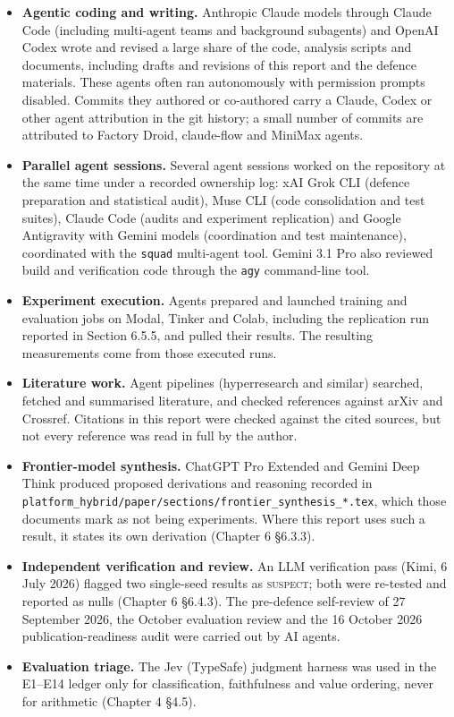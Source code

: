 \begin{itemize}
\item \textbf{Agentic coding and writing.} Anthropic Claude models through
Claude Code (including multi-agent teams and background subagents) and OpenAI
Codex wrote and revised a large share of the code, analysis scripts and documents,
including drafts and revisions of this report and the defence materials. These
agents often ran autonomously with permission prompts disabled. Commits they
authored or co-authored carry a Claude, Codex or other agent attribution in
the git history; a small number of commits are attributed to Factory Droid,
claude-flow and MiniMax agents.
\item \textbf{Parallel agent sessions.} Several agent sessions worked on the
repository at the same time under a recorded ownership log: xAI Grok CLI
(defence preparation and statistical audit), Muse CLI (code consolidation and
test suites), Claude Code (audits and experiment replication) and Google
Antigravity with Gemini models (coordination and test maintenance), coordinated
with the \texttt{squad} multi-agent tool. Gemini 3.1 Pro also reviewed build
and verification code through the \texttt{agy} command-line tool.
\item \textbf{Experiment execution.} Agents prepared and launched training and
evaluation jobs on Modal, Tinker and Colab, including the replication run
reported in Section 6.5.5, and pulled their results. The resulting
measurements come from those executed runs.
\item \textbf{Literature work.} Agent pipelines (hyperresearch and similar)
searched, fetched and summarised literature, and checked references against
arXiv and Crossref. Citations in this report were checked against the cited
sources, but not every reference was read in full by the author.
\item \textbf{Frontier-model synthesis.} ChatGPT Pro Extended and Gemini Deep
Think produced proposed derivations and reasoning recorded in
\texttt{platform\_hybrid/paper/sections/frontier\_synthesis\_*.tex}, which those
documents mark as not being experiments. Where this report uses such a result,
it states its own derivation (Chapter 6 \S6.3.3).
\item \textbf{Independent verification and review.} An LLM verification pass
(Kimi, 6 July 2026) flagged two single-seed results as \textsc{suspect}; both
were re-tested and reported as nulls (Chapter 6 \S6.4.3). The pre-defence
self-review of 27 September 2026, the October evaluation review and the
16 October 2026 publication-readiness audit were carried out by AI agents.
\item \textbf{Evaluation triage.} The Jev (TypeSafe) judgment harness was used
in the E1--E14 ledger only for classification, faithfulness and value
ordering, never for arithmetic (Chapter 4 \S4.5).
\end{itemize}

